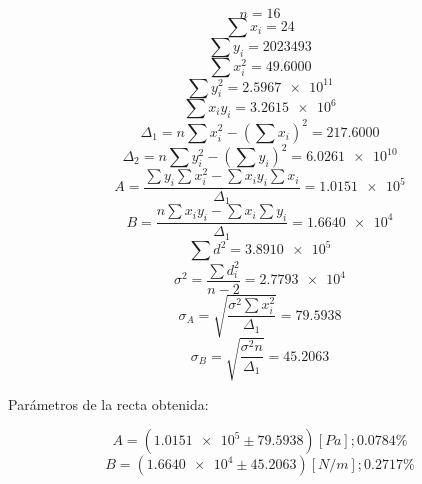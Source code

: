 \documentclass[letter,11pt]{article}
\begin{document}
\begin{equation*}
    n = 16
\end{equation*}
\begin{equation*}
    \sum x_i = 24
\end{equation*}
\begin{equation*}
    \sum y_i = 2023493
\end{equation*}
\begin{equation*}
    \sum x^2_i = 49.6000
\end{equation*}
\begin{equation*}
    \sum y^2_i = \num{2.5967e11}
\end{equation*}
\begin{equation*}
    \sum x_i y_i = \num{3.2615e6}
\end{equation*}
\begin{equation*}
    \Delta_1 = n \sum x^2_i - \left( \sum x_i \right)^2 = 217.6000
\end{equation*}
\begin{equation*}
    \Delta_2 = n \sum y^2_i - \left( \sum y_i \right)^2 = \num{6.0261e10}
\end{equation*}
\begin{equation*}
    A = \frac{\sum y_i \sum x^2_i - \sum x_i y_i \sum x_i}{\Delta_1} = \num{1.0151e5}
\end{equation*}
\begin{equation*}
    B = \frac{n \sum x_i y_i - \sum x_i \sum y_i}{\Delta_1} = \num{1.6640e4}
\end{equation*}
\begin{equation*}
    \sum d^2 = \num{3.8910e5}
\end{equation*}
\begin{equation*}
    \sigma^2 = \frac{\sum d^2_i}{n-2} = \num{2.7793e4}
\end{equation*}
\begin{equation*}
    \sigma_A = \sqrt{\frac{\sigma^2 \sum x^2_i}{\Delta_1}} = 79.5938
\end{equation*}
\begin{equation*}
    \sigma_B = \sqrt{\frac{\sigma^2 n}{\Delta_1}} = 45.2063
\end{equation*}
\vspace{0.10cm}

Parámetros de la recta obtenida:

\begin{equation*}
    A = (\num{1.0151e5} \pm 79.5938) [Pa]; 0.0784\%
\end{equation*}
\begin{equation*}
    B = (\num{1.6640e4} \pm 45.2063) [N/m]; 0.2717\%
\end{equation*}
\vspace{0.10cm}
\end{document}
